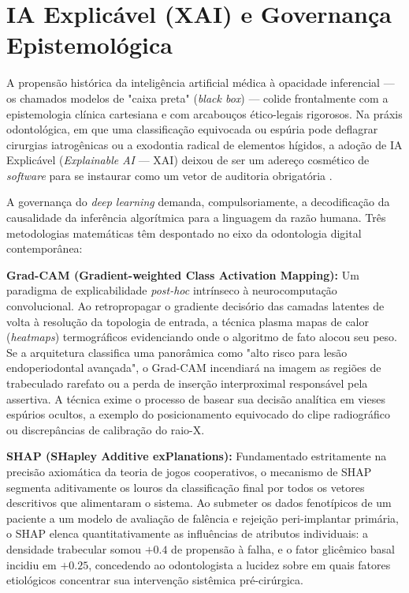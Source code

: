 \section{IA Explicável (XAI) e Governança Epistemológica}
\label{sec:ia-xai}

A propensão histórica da inteligência artificial médica à opacidade inferencial — os chamados modelos de "caixa preta" (\textit{black box}) — colide frontalmente com a epistemologia clínica cartesiana e com arcabouços ético-legais rigorosos. Na práxis odontológica, em que uma classificação equivocada ou espúria pode deflagrar cirurgias iatrogênicas ou a exodontia radical de elementos hígidos, a adoção de IA Explicável (\textit{Explainable AI} --- XAI) deixou de ser um adereço cosmético de \textit{software} para se instaurar como um vetor de auditoria obrigatória \cite{ethical2026realising}.

A governança do \textit{deep learning} demanda, compulsoriamente, a decodificação da causalidade da inferência algorítmica para a linguagem da razão humana. Três metodologias matemáticas têm despontado no eixo da odontologia digital contemporânea:

\textbf{Grad-CAM (Gradient-weighted Class Activation Mapping):} Um paradigma de explicabilidade \textit{post-hoc} intrínseco à neurocomputação convolucional. Ao retropropagar o gradiente decisório das camadas latentes de volta à resolução da topologia de entrada, a técnica plasma mapas de calor (\textit{heatmaps}) termográficos evidenciando onde o algoritmo de fato alocou seu peso. Se a arquitetura classifica uma panorâmica como "alto risco para lesão endoperiodontal avançada", o Grad-CAM incendiará na imagem as regiões de trabeculado rarefato ou a perda de inserção interproximal responsável pela assertiva. A técnica exime o processo de basear sua decisão analítica em vieses espúrios ocultos, a exemplo do posicionamento equivocado do clipe radiográfico ou discrepâncias de calibração do raio-X.

\textbf{SHAP (SHapley Additive exPlanations):} Fundamentado estritamente na precisão axiomática da teoria de jogos cooperativos, o mecanismo de SHAP segmenta aditivamente os louros da classificação final por todos os vetores descritivos que alimentaram o sistema. Ao submeter os dados fenotípicos de um paciente a um modelo de avaliação de falência e rejeição peri-implantar primária, o SHAP elenca quantitativamente as influências de atributos individuais: a densidade trabecular somou $+0.4$ de propensão à falha, e o fator glicêmico basal incidiu em $+0.25$, concedendo ao odontologista a lucidez sobre em quais fatores etiológicos concentrar sua intervenção sistêmica pré-cirúrgica.

